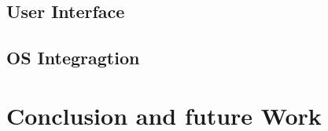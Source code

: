 \documentclass[11pt,a4paper]{scrreprt}
\begin{document}
\section{User Interface} %
\label{sec:user_interface}


\section{OS Integragtion} %
\label{sec:android_integration}


\chapter{Conclusion and future Work} %
\label{chp:platform_choice}


%
%
\end{document}
